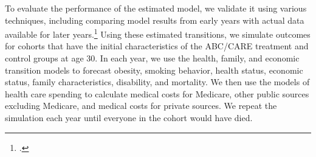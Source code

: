 \noindent To evaluate the performance of the estimated model, we validate it using various techniques, including comparing model results from early years with actual data available for later years.\footnote{\citet{Goldman_etal_2015_Future-Adult-Model}.} Using these estimated transitions, we simulate outcomes for cohorts that have the initial characteristics of the ABC/CARE treatment and control groups at age 30. In each year, we use the health, family, and economic transition models to forecast obesity, smoking behavior, health status, economic status, family characteristics, disability, and mortality. We then use the models of health care spending to calculate medical costs for Medicare, other public sources excluding Medicare, and medical costs for private sources. We repeat the simulation each year until everyone in the cohort would have died. 
